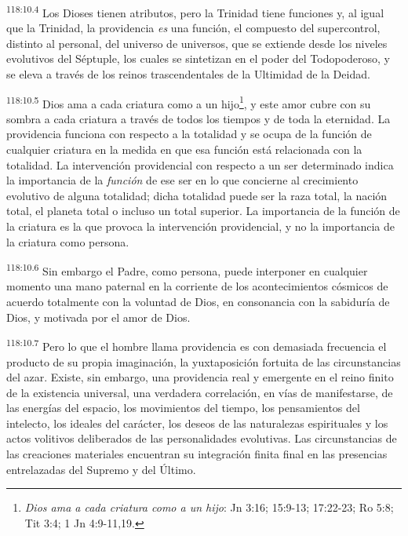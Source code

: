 \documentclass[twoside, 11pt]{book}
\begin{document}
\par
\textsuperscript{118:10.4} Los Dioses tienen atributos, pero la Trinidad tiene funciones y, al igual que la Trinidad, la providencia \textit{es} una función, el compuesto del supercontrol, distinto al personal, del universo de universos, que se extiende desde los niveles evolutivos del Séptuple, los cuales se sintetizan en el poder del Todopoderoso, y se eleva a través de los reinos trascendentales de la Ultimidad de la Deidad.

\par
\textsuperscript{118:10.5} Dios ama a cada criatura como a un hijo\footnote{\textit{Dios ama a cada criatura como a un hijo}: Jn 3:16; 15:9-13; 17:22-23; Ro 5:8; Tit 3:4; 1 Jn 4:9-11,19.}, y este amor cubre con su sombra a cada criatura a través de todos los tiempos y de toda la eternidad. La providencia funciona con respecto a la totalidad y se ocupa de la función de cualquier criatura en la medida en que esa función está relacionada con la totalidad. La intervención providencial con respecto a un ser determinado indica la importancia de la \textit{función} de ese ser en lo que concierne al crecimiento evolutivo de alguna totalidad; dicha totalidad puede ser la raza total, la nación total, el planeta total o incluso un total superior. La importancia de la función de la criatura es la que provoca la intervención providencial, y no la importancia de la criatura como persona.

\par
\textsuperscript{118:10.6} Sin embargo el Padre, como persona, puede interponer en cualquier momento una mano paternal en la corriente de los acontecimientos cósmicos de acuerdo totalmente con la voluntad de Dios, en consonancia con la sabiduría de Dios, y motivada por el amor de Dios.

\par
\textsuperscript{118:10.7} Pero lo que el hombre llama providencia es con demasiada frecuencia el producto de su propia imaginación, la yuxtaposición fortuita de las circunstancias del azar. Existe, sin embargo, una providencia real y emergente en el reino finito de la existencia universal, una verdadera correlación, en vías de manifestarse, de las energías del espacio, los movimientos del tiempo, los pensamientos del intelecto, los ideales del carácter, los deseos de las naturalezas espirituales y los actos volitivos deliberados de las personalidades evolutivas. Las circunstancias de las creaciones materiales encuentran su integración finita final en las presencias entrelazadas del Supremo y del Último.
\end{document}
